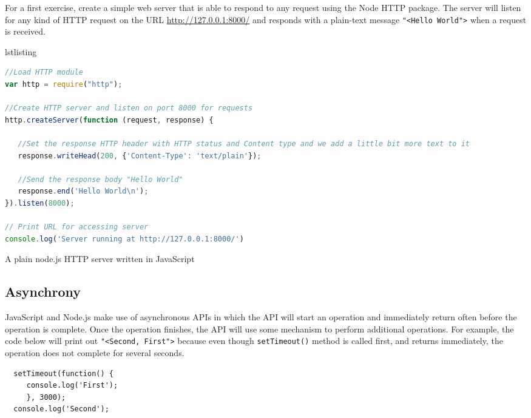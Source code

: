\documentclass[a4paper, justified, notoc]{tufte-handout} %
\makeatletter
\newenvironment{listing}[1][htbp] %
  {\ifvmode\else\unskip\fi\begin{@tufte@float}[#1]{lstlisting}{}}
  {\end{@tufte@float} } %
\makeatother
\begin{document}
For a first exercise, create a simple web server
 that is able to respond to any request using the Node HTTP package. The server will listen for any kind of HTTP request on the URL \url{http://127.0.0.1:8000/} and responds with a  plain-text message \texttt{"<Hello World">} when a request is received.


\begin{listing}
\begin{lstlisting}[language=JavaScript]
//Load HTTP module
var http = require("http");

//Create HTTP server and listen on port 8000 for requests
http.createServer(function (request, response) {

   //Set the response HTTP header with HTTP status and Content type and we add a little bit more text to it
   response.writeHead(200, {'Content-Type': 'text/plain'});
   
   //Send the response body "Hello World"
   response.end('Hello World\n');
}).listen(8000);

// Print URL for accessing server
console.log('Server running at http://127.0.0.1:8000/')
\end{lstlisting}
	\caption{A plain node.js HTTP server written in JavaScript} 
	\label{plain_server}
\end{listing}

\subsection{Asynchrony} %
\label{sub:asynchrony}

JavaScript and Node.js make use of asynchronous APIs in which the API will start an operation and immediately return often before the operation is complete. Once the operation finishes, the API will use some mechanism to perform additional operations. For example, the code below will print out \texttt{"<Second, First">} because even though \texttt{setTimeout()} method is called first, and returns immediately, the operation does not complete for several seconds.

\begin{Verbatim}
  setTimeout(function() {
     console.log('First');
     }, 3000);
  console.log('Second');
\end{Verbatim}
\end{document}
